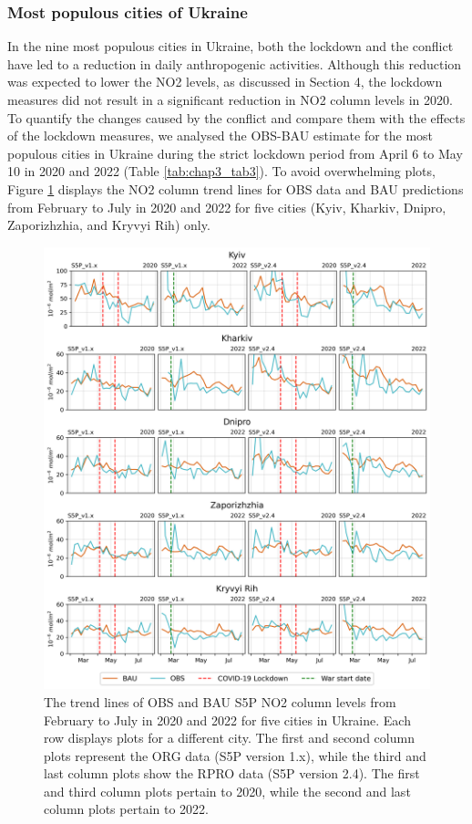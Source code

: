 \subsubsection*{Most populous cities of Ukraine}
In the nine most populous cities in Ukraine, both the lockdown and the conflict have led to a reduction in daily anthropogenic activities. Although this reduction was expected to lower the NO2 levels, as discussed in Section 4, the lockdown measures did not result in a significant reduction in NO2 column levels in 2020. To quantify the changes caused by the conflict and compare them with the effects of the lockdown measures, we analysed the OBS-BAU estimate for the most populous cities in Ukraine during the strict lockdown period from April 6 to May 10 in 2020 and 2022 (Table \ref{tab:chap3_tab3}). To avoid overwhelming plots, Figure \ref{fig:chap3_fig8} displays the NO2 column trend lines for OBS data and BAU predictions from February to July in 2020 and 2022 for five cities (Kyiv, Kharkiv, Dnipro, Zaporizhzhia, and Kryvyi Rih) only.\par
\begin{figure}[p]
    \centering
    \includegraphics[width=\textwidth]{figs/chap3/fig8.png}
    \caption[OBS and BAU S5P NO2 trends (2020-2022) in populous cities]{The trend lines of OBS and BAU S5P NO2 column levels from February to July in 2020 and 2022 for five cities in Ukraine. Each row displays plots for a different city. The first and second column plots represent the ORG data (S5P version 1.x), while the third and last column plots show the RPRO data (S5P version 2.4). The first and third column plots pertain to 2020, while the second and last column plots pertain to 2022.}
    \label{fig:chap3_fig8}
\end{figure}


